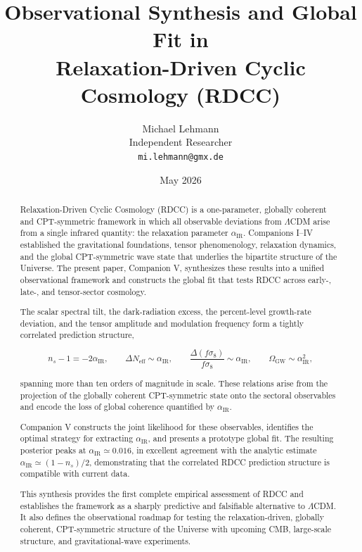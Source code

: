 \documentclass[11pt,a4paper]{article}
\title{\textbf{Observational Synthesis and Global Fit in\\
Relaxation-Driven Cyclic Cosmology (RDCC)}}
\author{Michael Lehmann \\
        Independent Researcher \\
        \texttt{mi.lehmann@gmx.de}}
\date{May 2026}
\begin{document}
\maketitle

\begin{abstract}
Relaxation-Driven Cyclic Cosmology (RDCC) is a one-parameter, globally coherent and
CPT-symmetric framework in which all observable deviations from $\Lambda$CDM arise from a
single infrared quantity: the relaxation parameter $\alpha_{\mathrm{IR}}$. Companions I–IV established
the gravitational foundations, tensor phenomenology, relaxation dynamics, and the global
CPT-symmetric wave state that underlies the bipartite structure of the Universe. The present
paper, Companion V, synthesizes these results into a unified observational framework and
constructs the global fit that tests RDCC across early-, late-, and tensor-sector cosmology.

The scalar spectral tilt, the dark-radiation excess, the percent-level growth-rate deviation,
and the tensor amplitude and modulation frequency form a tightly correlated prediction
structure,


\[
n_s - 1 = -2\alpha_{\mathrm{IR}}, \qquad
\Delta N_{\mathrm{eff}} \sim \alpha_{\mathrm{IR}}, \qquad
\frac{\Delta(f\sigma_8)}{f\sigma_8} \sim \alpha_{\mathrm{IR}}, \qquad
\Omega_{\mathrm{GW}} \sim \alpha_{\mathrm{IR}}^2,
\]


spanning more than ten orders of magnitude in scale. These relations arise from the projection
of the globally coherent CPT-symmetric state onto the sectoral observables and encode the
loss of global coherence quantified by $\alpha_{\mathrm{IR}}$.

Companion V constructs the joint likelihood for these observables, identifies the optimal
strategy for extracting $\alpha_{\mathrm{IR}}$, and presents a prototype global fit. The resulting
posterior peaks at $\alpha_{\mathrm{IR}} \simeq 0.016$, in excellent agreement with the analytic
estimate $\alpha_{\mathrm{IR}} \simeq (1 - n_s)/2$, demonstrating that the correlated RDCC
prediction structure is compatible with current data.

This synthesis provides the first complete empirical assessment of RDCC and establishes the
framework as a sharply predictive and falsifiable alternative to $\Lambda$CDM. It also defines
the observational roadmap for testing the relaxation-driven, globally coherent, CPT-symmetric
structure of the Universe with upcoming CMB, large-scale structure, and gravitational-wave
experiments.
\end{abstract}
\end{document}
